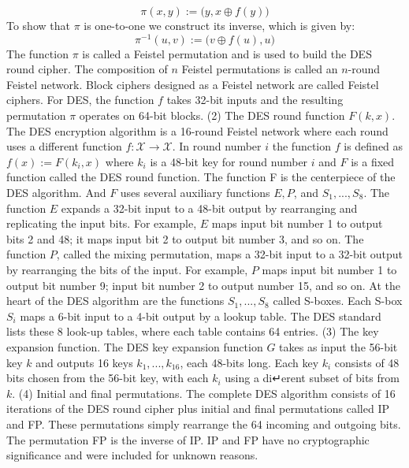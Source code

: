 \documentclass[a4paper,12pt,UTF8]{ctexart}
\begin{document}
\begin{spacing}{1.1}
\begin{equation}
\pi(x,y) := \big(y, x \oplus f(y)\big)
\end{equation}
\indent To show that $\pi$ is one-to-one we construct its inverse, which is given by:
\begin{equation}
\pi^{-1}(u,v) := \big(v \oplus f(u), u\big)
\end{equation}
\indent The function $\pi$ is called a Feistel permutation and is used to build the DES round cipher. The composition of $n$ Feistel permutations is called an $n$-round Feistel network. Block ciphers designed as a Feistel network are called Feistel ciphers. For DES, the function $f$ takes 32-bit inputs and the resulting permutation $\pi$ operates on 64-bit blocks.
\newline\indent (2) The DES round function $F(k,x)$.
\newline\indent The DES encryption algorithm is a 16-round Feistel network where each round uses a different function $f :\mathcal{X}\rightarrow\mathcal{X}$. In round number $i$ the function $f$ is deﬁned as $f(x) := F(k_i,x)$ where $k_i$ is a 48-bit key for round number $i$ and $F$ is a fixed function called the DES round function. The function F is the centerpiece of the DES algorithm. And $F$ uses several auxiliary functions $E,P$, and $S_1,...,S_8$. The function $E$ expands a 32-bit input to a 48-bit output by rearranging and replicating the input bits. For example, $E$ maps input bit number 1 to output bits 2 and 48; it maps input bit 2 to output bit number 3, and so on. The function $P$, called the mixing permutation, maps a 32-bit input to a 32-bit output by rearranging the bits of the input. For example, $P$ maps input bit number 1 to output bit number 9; input bit number 2 to output number 15, and so on. At the heart of the DES algorithm are the functions $S_1,...,S_8$ called S-boxes. Each S-box $S_i$ maps a 6-bit input to a 4-bit output by a lookup table. The DES standard lists these 8 look-up tables, where each table contains 64 entries.
\newline\indent(3) The key expansion function.
\newline\indent  The DES key expansion function $G$ takes as input the 56-bit key $k$ and outputs 16 keys $k_1,...,k_16$, each 48-bits long. Each key $k_i$ consists of 48 bits chosen from the 56-bit key, with each $k_i$ using a di↵erent subset of bits from $k$.
\newline\indent(4) Initial and final permutations. 
\newline\indent The complete DES algorithm consists of 16 iterations of the DES round cipher plus initial and final permutations called IP and FP. These permutations simply rearrange the 64 incoming and outgoing bits. The permutation FP is the inverse of IP. IP and FP have no cryptographic significance and were included for unknown reasons. \vspace{3mm}

\end{spacing}
\end{document}
